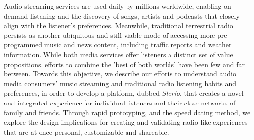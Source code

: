 \noindent Audio streaming services are used daily by millions worldwide, enabling on-demand listening and the discovery of songs, artists and podcasts that closely align with the listener's preferences. Meanwhile, traditional terrestrial radio persists as another ubiquitous and still viable mode of accessing more pre-programmed music and news content, including traffic reports and weather information. While both media services offer listeners a distinct set of value propositions, efforts to combine the 'best of both worlds' have been few and far between. Towards this objective, we describe our efforts to understand audio media consumers' music streaming and traditional radio listening habits and preferences, in order to develop a platform, dubbed \textit{Sterio}, that creates a novel and integrated experience for individual listeners and their close networks of family and friends. Through rapid prototyping, and the speed dating method, we explore the design implications for creating and validating radio-like experiences that are at once personal, customizable and shareable.